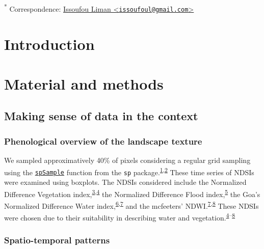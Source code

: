 \documentclass[12pt,oneside]{article}
\begin{document}
\textsuperscript{*} Correspondence: \href{mailto:issoufoul@gmail.com}{Issoufou Liman \textless{}\href{mailto:issoufoul@gmail.com}{\nolinkurl{issoufoul@gmail.com}}\textgreater{}}

\hypertarget{intro}{%
\section{Introduction}\label{intro}}

\hypertarget{I}{%
\section{Material and methods}\label{I}}

\hypertarget{I4}{%
\subsection{Making sense of data in the context}\label{I4}}

\hypertarget{I41}{%
\subsubsection{Phenological overview of the landscape texture}\label{I41}}

We sampled approximatively 40\% of pixels considering a regular grid sampling using the \href{https://www.rdocumentation.org/packages/sp/versions/1.3-1/topics/spsample}{\texttt{spSample}} function from the \texttt{sp} package.\textsuperscript{\protect\hyperlink{ref-Bivand_et_al_2013}{1},\protect\hyperlink{ref-Pebesma_Bivand_2005}{2}} These time series of NDSIs were examined using boxplots. The NDSIs considered include the Normalized Difference Vegetation index,\textsuperscript{\protect\hyperlink{ref-Rouse_et_al_1973}{3},\protect\hyperlink{ref-Tucker_1979}{4}} the Normalized Difference Flood index,\textsuperscript{\protect\hyperlink{ref-Boschetti_et_al_2014}{5}} the Goa's Normalized Difference Water index,\textsuperscript{\protect\hyperlink{ref-Gao_1996}{6},\protect\hyperlink{ref-Ji_et_al_2009}{7}} and the mcfeeters' NDWI.\textsuperscript{\protect\hyperlink{ref-Ji_et_al_2009}{7},\protect\hyperlink{ref-McFeeters_1996}{8}} These NDSIs were chosen due to their suitability in describing water and vegetation.\textsuperscript{\protect\hyperlink{ref-Tucker_1979}{4}--\protect\hyperlink{ref-McFeeters_1996}{8}}

\hypertarget{I42}{%
\subsubsection{Spatio-temporal patterns}\label{I42}}
\end{document}
